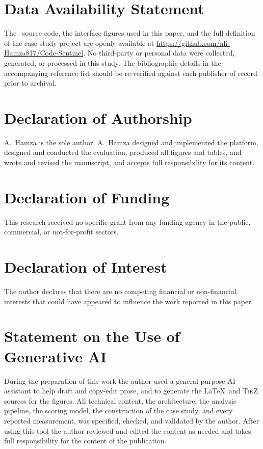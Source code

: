 \section*{Data Availability Statement}
The \cs\ source code, the interface figures used in this paper, and the
full definition of the case-study project are openly available at
\url{https://github.com/ali-Hamza817/Code-Sentinel}. No third-party or
personal data were collected, generated, or processed in this study. The
bibliographic details in the accompanying reference list should be
re-verified against each publisher of record prior to archival.

\section*{Declaration of Authorship}
A.~Hamza is the sole author. A.~Hamza designed and implemented the
platform, designed and conducted the evaluation, produced all figures and
tables, and wrote and revised the manuscript, and accepts full
responsibility for its content.

\section*{Declaration of Funding}
This research received no specific grant from any funding agency in the
public, commercial, or not-for-profit sectors.

\section*{Declaration of Interest}
The author declares that there are no competing financial or non-financial
interests that could have appeared to influence the work reported in this
paper.

\section*{Statement on the Use of Generative AI}
During the preparation of this work the author used a general-purpose
AI assistant to help draft and copy-edit prose, and to generate the
\LaTeX\ and \textsc{TikZ} sources for the figures. All technical
content, the architecture, the analysis pipeline, the scoring model, the
construction of the case study, and every reported measurement, was
specified, checked, and validated by the author. After using this tool
the author reviewed and edited the content as needed and takes full
responsibility for the content of the publication.
